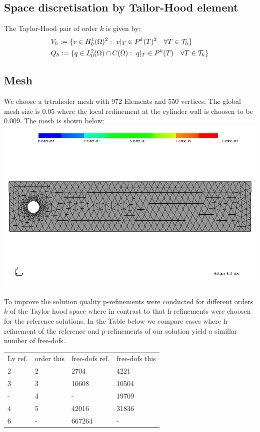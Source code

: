 \documentclass[11pt]{article}
\begin{document}
\subsection{Space discretisation by Tailor-Hood element}
The Taylor-Hood pair of order $k$ is given by:
\begin{align}
	& V_h := \{v \in H_0^1(\Omega)^2:\ v|_T\in P^k(T)^2\quad \forall T\in\mathcal{T}_h \} \notag \\
	& Q_h := \{q \in L_0^2(\Omega)\cap C(\bar{\Omega}):\ q|_T\in P^k(T)\quad \forall T\in\mathcal{T}_h \} \notag \\
\end{align}

\subsection{Mesh}
We choose a trtraheder mesh with 972 Elements and 550 vertices. The global mesh size is 0.05 where the local redinement at the cylinder wall is choosen to be 0.009. The mesh is shown below:
\includegraphics[width=0.7\columnwidth]{mesh35}

To improve the solution quality p-refinements were conducted for different orders $k$ of the Taylor hood space where in contrast to that h-refinements were choosen for the reference solutions. In the Table below we compare cases where h-refinement of the reference and p-refinements of our solution yield a simillar number of free-dofs.

\begin{tabular}{l l l l}
	Lv ref. & order this & free-dofs ref. & free-dofs this\\
	2       & 2	& 2704  & 4221\\
	3       & 3	& 10608 & 10504\\
	-       & 4 	& -	& 19709\\
	4       & 5	& 42016 & 31836\\
	6 	& - 	& 667264& -
\end{tabular}
\end{document}
